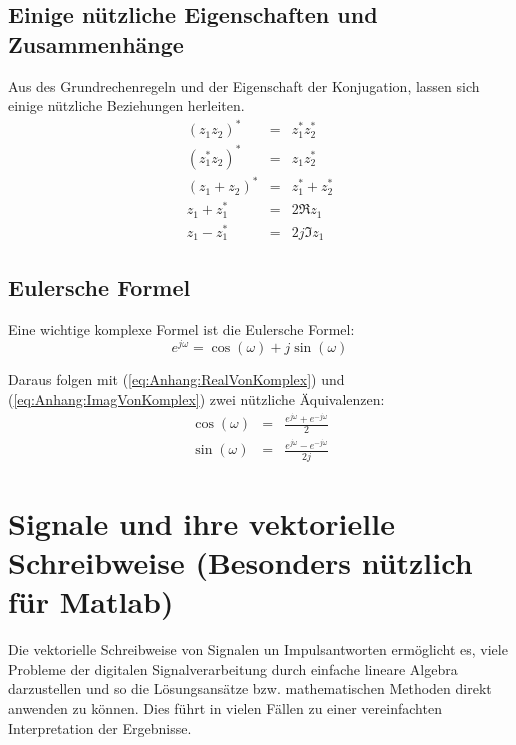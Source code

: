 \subsection{Einige nützliche Eigenschaften und Zusammenhänge}
Aus des Grundrechenregeln und der Eigenschaft der Konjugation,
lassen sich einige nützliche Beziehungen herleiten.
    \begin{eqnarray}\label{eq:KomplexNuetzlich}
    (z_1 z_2)^{\ast} & = &  z_1^{\ast} z_2^{\ast}\\
    (z_1^{\ast} z_2)^{\ast} & = & z_1 z_2^{\ast} \\
    (z_1 + z_2)^{\ast} & = &  z_1^{\ast} + z_2^{\ast}\\
    \label{eq:Anhang:RealVonKomplex}
    z_1 + z_1^{\ast} & = & 2 \Re{z_1}\\
    \label{eq:Anhang:ImagVonKomplex}
    z_1 - z_1^{\ast} & = & 2j \Im{z_1}
    \end{eqnarray}

\subsection{Eulersche Formel}
Eine wichtige komplexe Formel ist die Eulersche Formel:
\begin{equation}\label{eq:Def:Euler}
    e^{j \omega}  = \cos(\omega) + j \sin (\omega)
\end{equation}

Daraus folgen mit (\ref{eq:Anhang:RealVonKomplex}) und
(\ref{eq:Anhang:ImagVonKomplex}) zwei nützliche Äquivalenzen:
\begin{eqnarray}
    \cos (\omega) &=& \frac{e^{j \omega} + e^{-j \omega}}{2}\\
    \sin(\omega) &=& \frac{e^{j \omega} -  e^{-j \omega}}{2j}
\end{eqnarray}

\section{Signale und ihre vektorielle Schreibweise (Besonders nützlich für Matlab)}
Die vektorielle Schreibweise von Signalen un Impulsantworten
ermöglicht es, viele Probleme der digitalen Signalverarbeitung durch
einfache lineare Algebra darzustellen und so die Lösungsansätze bzw.
mathematischen Methoden direkt anwenden zu können. Dies führt in
vielen Fällen zu einer vereinfachten Interpretation der Ergebnisse.

